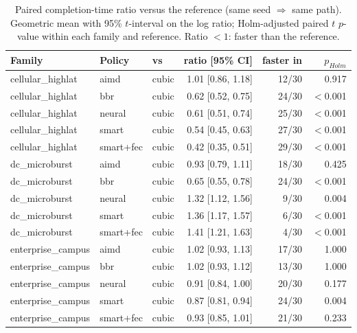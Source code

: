 \begin{table}[t]\centering\footnotesize
\caption{Paired completion-time ratio versus the reference (same seed $\Rightarrow$ same path). Geometric mean with 95\% $t$-interval on the log ratio; Holm-adjusted paired $t$ $p$-value within each family and reference. Ratio $<1$: faster than the reference.}
\label{tab:scalepaired-proxy}\begin{tabular}{lllrrr}\toprule
Family & Policy & vs & ratio [95\% CI] & faster in & $p_{Holm}$\\\midrule
cellular\_highlat & aimd & cubic & 1.01 [0.86, 1.18] & 12/30 & 0.917 \\
cellular\_highlat & bbr & cubic & 0.62 [0.52, 0.75] & 24/30 & $<$0.001 \\
cellular\_highlat & neural & cubic & 0.61 [0.51, 0.74] & 25/30 & $<$0.001 \\
cellular\_highlat & smart & cubic & 0.54 [0.45, 0.63] & 27/30 & $<$0.001 \\
cellular\_highlat & smart+fec & cubic & 0.42 [0.35, 0.51] & 29/30 & $<$0.001 \\
dc\_microburst & aimd & cubic & 0.93 [0.79, 1.11] & 18/30 & 0.425 \\
dc\_microburst & bbr & cubic & 0.65 [0.55, 0.78] & 24/30 & $<$0.001 \\
dc\_microburst & neural & cubic & 1.32 [1.12, 1.56] & 9/30 & 0.004 \\
dc\_microburst & smart & cubic & 1.36 [1.17, 1.57] & 6/30 & $<$0.001 \\
dc\_microburst & smart+fec & cubic & 1.41 [1.21, 1.63] & 4/30 & $<$0.001 \\
enterprise\_campus & aimd & cubic & 1.02 [0.93, 1.13] & 17/30 & 1.000 \\
enterprise\_campus & bbr & cubic & 1.02 [0.93, 1.12] & 13/30 & 1.000 \\
enterprise\_campus & neural & cubic & 0.91 [0.84, 1.00] & 20/30 & 0.177 \\
enterprise\_campus & smart & cubic & 0.87 [0.81, 0.94] & 24/30 & 0.004 \\
enterprise\_campus & smart+fec & cubic & 0.93 [0.85, 1.01] & 21/30 & 0.233 \\
\bottomrule\end{tabular}\end{table}
